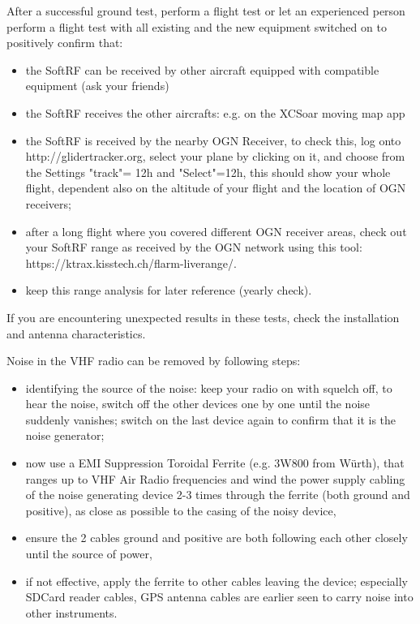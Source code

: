 \documentclass[10pt,a4paper]{article}
\begin{document}
After a successful ground test, perform a flight test or let an experienced person perform a flight test with all existing and the new equipment switched on to positively confirm that:

\begin{itemize}
\item the SoftRF can be received by other aircraft equipped with compatible equipment (ask your friends)
\item the SoftRF receives the other aircrafts: e.g. on the XCSoar moving map app
\item the SoftRF is received by the nearby OGN Receiver, to check this, log onto http://glidertracker.org, select your plane by clicking on it, and choose from the Settings "track"= 12h and "Select"=12h, this should show your whole flight, dependent also on the altitude of your flight and the location of OGN receivers;
\item after a long flight where you covered different OGN receiver areas, check out your SoftRF range as received by the OGN network using this tool: https://ktrax.kisstech.ch/flarm-liverange/.
\item keep this range analysis for later reference (yearly check).
\end{itemize}

If you are encountering unexpected results in these tests, check the installation and antenna characteristics.

Noise in the VHF radio can be removed by following steps:
\begin{itemize}
\item identifying the source of the noise: keep your radio on with squelch off, to hear the noise, switch off the other devices one by one until the noise suddenly vanishes; switch on the last device again to confirm that it is the noise generator;
\item now use a EMI Suppression Toroidal Ferrite (e.g. 3W800 from Würth), that ranges up to VHF Air Radio frequencies and wind the power supply cabling of the noise generating device 2-3 times through the ferrite (both ground and positive), as close as possible to the casing of the noisy device,
\item ensure the 2 cables ground and positive are both following each other closely until the source of power,
\item if not effective, apply the ferrite to other cables leaving the device; especially SDCard reader cables, GPS antenna cables are earlier seen to carry noise into other instruments.
\end{itemize}
\end{document}
